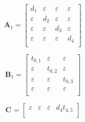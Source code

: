 \documentclass[11pt, a4paper, fleqn]{article}
\begin{document}
\begin{equation*}
\mathbf{A}_{1} = 
\left[\begin{array}{ cccc }
d_1	&\varepsilon	&\varepsilon	&\varepsilon\\
\varepsilon	&d_2	&\varepsilon	&\varepsilon\\
\varepsilon	&\varepsilon	&d_3	&\varepsilon\\
\varepsilon	&\varepsilon	&\varepsilon	&d_4\\
\end{array}\right]
\end{equation*}

\begin{equation*}
\mathbf{B}_{1} = 
\left[\begin{array}{ ccc }
t_{0,1}	&\varepsilon	&\varepsilon\\
\varepsilon	&t_{0,2}	&\varepsilon\\
\varepsilon	&\varepsilon	&t_{0,3}\\
\varepsilon	&\varepsilon	&\varepsilon\\
\end{array}\right]
\end{equation*}

\begin{equation*}
\mathbf{C}_{{}} = 
\left[\begin{array}{ cccc }
\varepsilon	&\varepsilon	&\varepsilon	&d_4t_{4,5}\\
\end{array}\right]
\end{equation*}
\end{document}
